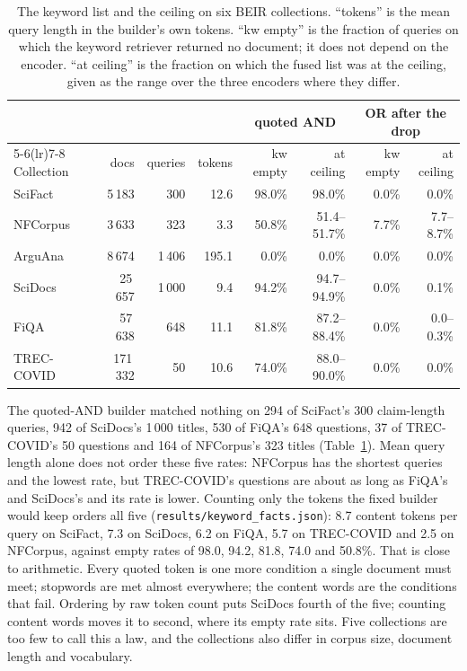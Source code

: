 \documentclass[11pt]{article}
\begin{document}
\begin{table}[h]
\centering
\small
\setlength{\tabcolsep}{4pt}
\begin{tabular}{lrrrrrrr}
\toprule
 & & & & \multicolumn{2}{c}{quoted AND} & \multicolumn{2}{c}{OR after the drop} \\
\cmidrule(lr){5-6}\cmidrule(lr){7-8}
Collection & docs & queries & tokens & kw empty & at ceiling & kw empty & at ceiling \\
\midrule
SciFact & 5\,183 & 300 & 12.6 & 98.0\% & 98.0\% & 0.0\% & 0.0\% \\
NFCorpus & 3\,633 & 323 & 3.3 & 50.8\% & 51.4--51.7\% & 7.7\% & 7.7--8.7\% \\
ArguAna & 8\,674 & 1\,406 & 195.1 & 0.0\% & 0.0\% & 0.0\% & 0.0\% \\
SciDocs & 25\,657 & 1\,000 & 9.4 & 94.2\% & 94.7--94.9\% & 0.0\% & 0.1\% \\
FiQA & 57\,638 & 648 & 11.1 & 81.8\% & 87.2--88.4\% & 0.0\% & 0.0--0.3\% \\
TREC-COVID & 171\,332 & 50 & 10.6 & 74.0\% & 88.0--90.0\% & 0.0\% & 0.0\% \\
\bottomrule
\end{tabular}
\caption{The keyword list and the ceiling on six BEIR collections. ``tokens'' is the mean query length in the builder's own tokens. ``kw empty'' is the fraction of queries on which the keyword retriever returned no document; it does not depend on the encoder. ``at ceiling'' is the fraction on which the fused list was at the ceiling, given as the range over the three encoders where they differ.}
\label{tab:legs}
\end{table}

The quoted-AND builder matched nothing on 294 of SciFact's 300 claim-length queries, 942 of SciDocs's 1\,000 titles, 530 of FiQA's 648 questions, 37 of TREC-COVID's 50 questions and 164 of NFCorpus's 323 titles (Table~\ref{tab:legs}). Mean query length alone does not order these five rates: NFCorpus has the shortest queries and the lowest rate, but TREC-COVID's questions are about as long as FiQA's and SciDocs's and its rate is lower. Counting only the tokens the fixed builder would keep orders all five (\texttt{results/keyword\_facts.json}): 8.7 content tokens per query on SciFact, 7.3 on SciDocs, 6.2 on FiQA, 5.7 on TREC-COVID and 2.5 on NFCorpus, against empty rates of 98.0, 94.2, 81.8, 74.0 and 50.8\%. That is close to arithmetic. Every quoted token is one more condition a single document must meet; stopwords are met almost everywhere; the content words are the conditions that fail. Ordering by raw token count puts SciDocs fourth of the five; counting content words moves it to second, where its empty rate sits. Five collections are too few to call this a law, and the collections also differ in corpus size, document length and vocabulary.
\end{document}
